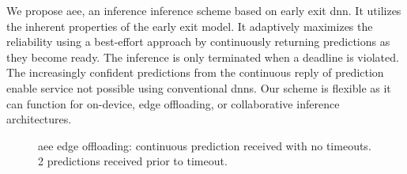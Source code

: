 We propose \acrfull{aee}, an inference inference scheme based on early exit \gls{dnn}. It utilizes the inherent properties of the early exit model. It adaptively maximizes the reliability using a best-effort approach by continuously returning predictions as they become ready. The inference is only terminated when a deadline is violated. The increasingly confident predictions from the continuous reply of prediction enable service not possible using conventional \gls{dnn}s. Our scheme is flexible as it can function for on-device, edge offloading, or collaborative inference architectures. 
\begin{figure}
	\captionsetup[subfigure]{justification=centering}
	\centering
\end{figure}
\begin{figure}
	\captionsetup[subfigure]{justification=centering}
	\centering
	\caption[Offloading scheme]{\gls{aee} edge offloading: \protect{} continuous prediction received with no timeouts. \protect{} 2 predictions received prior to timeout. }
	\label{fig:offloading-scheme}
\end{figure} 

